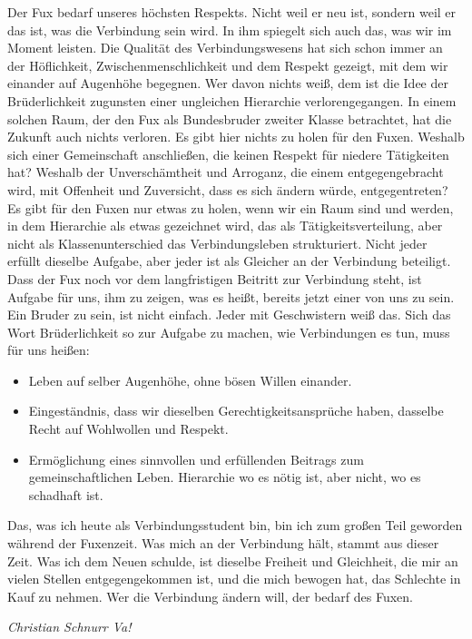 \begin{multicols}{2}
Der Fux bedarf unseres höchsten Respekts. Nicht weil er neu ist, sondern weil er das ist, was die Verbindung sein wird. In ihm spiegelt sich auch das, was wir im Moment leisten. Die Qualität des Verbindungswesens hat sich schon immer an der Höflichkeit, Zwischenmenschlichkeit und dem Respekt gezeigt, mit dem wir einander auf Augenhöhe begegnen. Wer davon nichts weiß, dem ist die Idee der Brüderlichkeit zugunsten einer ungleichen Hierarchie verlorengegangen. In einem solchen Raum, der den Fux als Bundesbruder zweiter Klasse betrachtet, hat die Zukunft auch nichts verloren. Es gibt hier nichts zu holen für den Fuxen. Weshalb sich einer Gemeinschaft anschließen, die keinen Respekt für niedere Tätigkeiten hat? Weshalb der Unverschämtheit und Arroganz, die einem entgegengebracht wird, mit Offenheit und Zuversicht, dass es sich ändern würde, entgegentreten? Es gibt für den Fuxen nur etwas zu holen, wenn wir ein Raum sind und werden, in dem Hierarchie als etwas gezeichnet wird, das als Tätigkeitsverteilung, aber nicht als Klassenunterschied das Verbindungsleben strukturiert. Nicht jeder erfüllt dieselbe Aufgabe, aber jeder ist als Gleicher an der Verbindung beteiligt. Dass der Fux noch vor dem langfristigen Beitritt zur Verbindung steht, ist Aufgabe für uns, ihm zu zeigen, was es heißt, bereits jetzt einer von uns zu sein.
Ein Bruder zu sein, ist nicht einfach. Jeder mit Geschwistern weiß das. Sich das Wort Brüderlichkeit so zur Aufgabe zu machen, wie Verbindungen es tun, muss für uns heißen:
\begin{itemize}
    \item Leben auf selber Augenhöhe, ohne bösen Willen einander.
    \item Eingeständnis, dass wir dieselben Gerechtigkeitsansprüche haben, dasselbe Recht auf Wohlwollen und Respekt.
    \item Ermöglichung eines sinnvollen und erfüllenden Beitrags zum gemeinschaftlichen Leben. Hierarchie wo es nötig ist, aber nicht, wo es schadhaft ist.
\end{itemize}
Das, was ich heute als Verbindungsstudent bin, bin ich zum großen Teil geworden während der Fuxenzeit. Was mich an der Verbindung hält, stammt aus dieser Zeit. Was ich dem Neuen schulde, ist dieselbe Freiheit und Gleichheit, die mir an vielen Stellen entgegengekommen ist, und die mich bewogen hat, das Schlechte in Kauf zu nehmen. Wer die Verbindung ändern will, der bedarf des Fuxen.
	\begin{flushright}
		\hfill\emph{Christian Schnurr Va! }
	\end{flushright}
\end{multicols}
%
